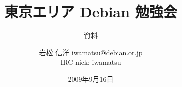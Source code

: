 




\documentclass[cjk,dvipdfmx,12pt]{beamer}
\usepackage{monthlypresentation}



\title{東京エリア Debian 勉強会}
\subtitle{資料}
\author{岩松 信洋 iwamatsu@debian.or.jp\\IRC nick: iwamatsu}
\date{2009年9月16日}



